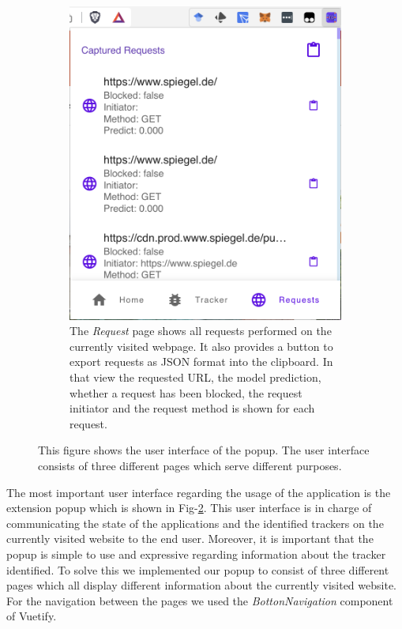\begin{figure}[ht!]
\begin{subfigure}[b]{.30\textwidth}
      \includegraphics[width=\linewidth, keepaspectratio]{images/Requests.png}
      \caption{The \emph{Request} page shows all requests performed on the currently visited webpage. It also provides a button to export
      requests as JSON format into the clipboard. In that view the requested URL, the model prediction, whether a request has been blocked,  the request initiator and the request 
    method is shown for each request.}
      \label{fig:Requests}
  \end{subfigure}
  \caption{This figure shows the user interface of the popup. The user interface consists of three different pages which
  serve different purposes.}
  \label{fig:popup}
\end{figure}  

The most important user interface regarding the usage of the application is the extension popup which is shown in Fig-\ref{fig:popup}.
This user interface is in charge of communicating the state of the applications and the identified trackers on the currently visited 
website to the end user. Moreover, it is important that the popup is simple to use and expressive regarding information about the tracker identified.
To solve this we implemented our popup to consist of three different pages which all display different information about the currently
visited website. For the navigation between the pages we used the \emph{BottonNavigation} component of Vuetify.

